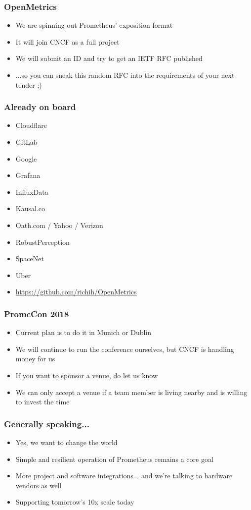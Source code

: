 \documentclass[t]{beamer}
\begin{document}
\begin{frame}
	\frametitle{OpenMetrics}
	\begin{itemize}
		\item We are spinning out Prometheus' exposition format
		\item It will join CNCF as a full project
		\item We will submit an ID and try to get an IETF RFC published
		\item ...so you can sneak this random RFC into the requirements of your next tender ;)
	\end{itemize}
\end{frame}

\begin{frame}
	\frametitle{Already on board}
	\begin{itemize}
		\item Cloudflare
		\item GitLab
		\item Google
		\item Grafana
		\item InfluxData
		\item Kausal.co
		\item Oath.com / Yahoo / Verizon
		\item RobustPerception
		\item SpaceNet
		\item Uber
		\item \url{https://github.com/richih/OpenMetrics}
	\end{itemize}
\end{frame}

\begin{frame}
	\frametitle{PromcCon 2018}
	\begin{itemize}
		\item Current plan is to do it in Munich or Dublin
		\item We will continue to run the conference ourselves, but CNCF is handling money for us
		\item If you want to sponsor a venue, do let us know
		\item We can only accept a venue if a team member is living nearby and is willing to invest the time
	\end{itemize}
\end{frame}

\begin{frame}
	\frametitle{Generally speaking...}
	\begin{itemize}
		\item Yes, we want to change the world
		\item Simple and resilient operation of Prometheus remains a core goal
		\item More project and software integrations... and we're talking to hardware vendors as well
		\item Supporting tomorrow's 10x scale today
	\end{itemize}
\end{frame}
\end{document}
